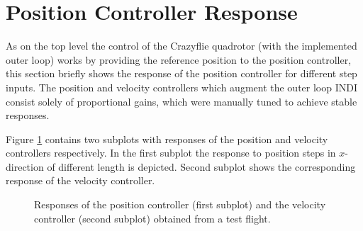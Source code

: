 \documentclass[11pt, a4paper, twoside]{report}
\begin{document}
\section{Position Controller Response} \label{sec:pos_controller_response}

As on the top level the control of the Crazyflie quadrotor (with the implemented outer loop) works by providing the reference position to the position controller, this section briefly shows the response of the position controller for different step inputs. The position and velocity controllers which augment the outer loop \acrshort{INDI} consist solely of proportional gains, which were manually tuned to achieve stable responses. 

Figure \ref{fig:results_responses} contains two subplots with responses of the position and velocity controllers respectively. In the first subplot the response to position steps in $x$-direction of different length is depicted. Second subplot shows the corresponding response of the velocity controller.

\begin{figure}[H]
	\centering 
	\captionsetup{justification=centering, singlelinecheck=off, font=bf, belowskip=-0.5cm}
	\caption[Responses of the position and velocity controllers obtained from a test flight]{Responses of the position controller (first subplot) and the velocity controller (second subplot) obtained from a test flight.}
	\label{fig:results_responses}
\end{figure}
\end{document}
